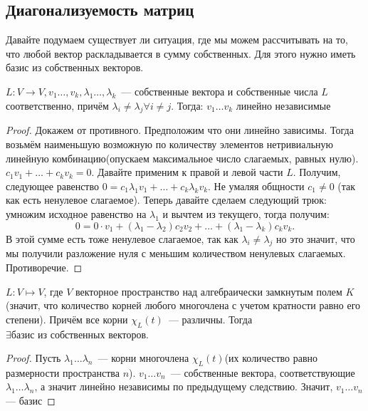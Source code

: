 \subsection*{Диагонализуемость матриц}
\begin{motivation}
    Давайте подумаем существует ли ситуация, где мы можем рассчитывать на то, что любой вектор раскладывается в сумму собственных.
    Для этого нужно иметь базис из собственных векторов.
\end{motivation}
\begin{theorem}
    $L: V\rightarrow V, v_1\dots, v_k, \lambda_1\dots, \lambda_k$~--- собственные вектора и собственные числа $L$ соответственно, причём
    $\lambda_i\not= \lambda_j \forall i\not= j$.
    Тогда:  $v_1\dots v_k$ линейно независимые
\end{theorem}
\begin{proof}
    Докажем от противного. Предположим что они линейно зависимы. Тогда возьмём наименьшую возможную по количеству элементов
    нетривиальную линейную комбинацию(опускаем максимальное число слагаемых, равных нулю).
    $c_1v_1+\dots+c_k v_k = 0$. Давайте применим к правой и левой части $L$. Получим, следующее равенство
    $0 = c_1\lambda_1v_1+\dots + c_k\lambda_k v_k$. Не умаляя общности $c_1\not=0$ (так как есть ненулевое слагаемое).
    Теперь давайте сделаем следующий трюк: умножим исходное равенство на $\lambda_1$ и вычтем из текущего, тогда получим:
    \[
    0 = 0\cdot v_1 + (\lambda_1 - \lambda_2)c_2v_2 + \dots + (\lambda_1 - \lambda_k) c_k v_k
    .\]
    В этой сумме есть тоже ненулевое слагаемое, так как $\lambda_i \not= \lambda_j$ но это значит, что мы получили
    разложение нуля с меньшим количеством ненулевых слагаемых. Противоречие.
\end{proof}
\begin{follow}
    $L\colon V \mapsto V$, где $V$ векторное пространство над алгебраически замкнутым полем $K$(значит, что количество корней
    любого многочлена с учетом кратности равно его степени). Причём все корни $\chi_L(t)$~--- различны.
    Тогда $\exists \text{базис из собственных векторов}$.
\end{follow}
\begin{proof}
    Пусть $\lambda_1\dots \lambda_n$~--- корни многочлена $\chi_L(t)$(их количество равно размерности пространства $n$).
    $v_1\dots v_n$~--- собственные вектора, соответствующие $\lambda_1\dots \lambda_n$, а значит линейно независимы по предыдущему следствию. Значит, $v_1\dots v_n$ --- базис 
\end{proof}
